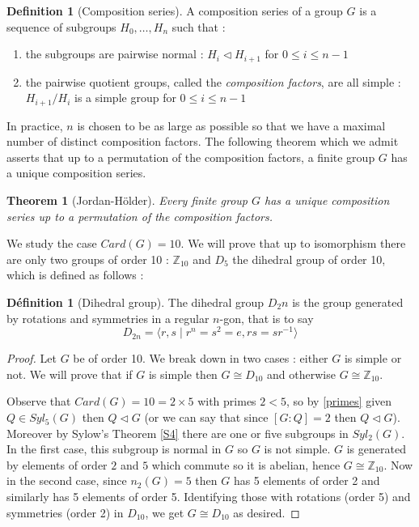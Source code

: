 \documentclass{article}
\theoremstyle{definition}
\newtheorem{definition}[subsubsection]{Définition}
\theoremstyle{plain}
\theoremstyle{plain}
\theoremstyle{plain}
\theoremstyle{plain}
\theoremstyle{definition}
\newtheorem{defeng}[subsubsection]{Definition}
\theoremstyle{plain}
\newtheorem{thmeng}[subsubsection]{Theorem}
\theoremstyle{plain}
\begin{document}
\begin{defeng}[Composition series]
	A composition series of a group \( G \) is a sequence of subgroups \( H_0, \ldots, H_n \) such that :
	\begin{enumerate}[label = (\roman*)]
	\item the subgroups are pairwise normal : 
		\( H_i \triangleleft H_{i+1} \) for \( 0 \leq i \leq n-1 \)
	\item the pairwise quotient groups, called the \textit{composition factors}, are all simple :
		\( H_{i+1}/H_{i} \) is a simple group for \( 0 \leq i \leq n-1 \)

	\end{enumerate}
\par In practice, \( n \) is chosen to be as large as possible so that we have
a maximal number of distinct composition factors. The following theorem which we admit asserts that up to a permutation of the composition factors, a finite group \( G \) has a unique composition series.

\begin{thmeng}[Jordan-Hölder]
	Every finite group \( G \) has a unique composition series up to a permutation of the composition factors.	
\end{thmeng}
\end{defeng}

\par We study the case \( Card(G) = 10 \). We will prove that up to isomorphism there are only two groups of order 10 : \( \mathbb{Z}_{10} \) and \( D_5 \) the dihedral group of order 10, which is defined as follows :

\begin{definition}[Dihedral group]
	The dihedral group \( D_2n \) is the group generated by rotations and symmetries in a regular \(n\)-gon, that is to say 
	\begin{equation*}
		D_{2n} = \langle r,s \mid r^{n} = s^{2} = e, rs = sr^{-1} \rangle 
	\end{equation*}
\end{definition}

\begin{proof}
	Let \( G \) be of order 10. We break down in two cases : either \( G \) is simple or not. We will prove that if \( G \) is simple then \( G \cong D_{10} \) and otherwise \( G \cong \mathbb{Z}_{10} \).

	Observe that \( Card(G) = 10 = 2 \times 5 \) with primes \( 2 < 5\), so by \cref{primes} given \( Q \in Syl_5(G) \) then \( Q \triangleleft G \) (or we can say that since \( [G:Q] = 2 \) then \( Q \triangleleft G \)).
	Moreover by Sylow's Theorem \ref{S4} there are one or five subgroups in \( Syl_2(G) \). In the first case, this subgroup is normal in \( G \) so \( G \) is not simple. \( G \) is generated by elements of order \( 2 \) and \( 5 \) which commute so it is abelian, hence \( G \cong \mathbb{Z}_{10} \). Now in the second case, since \( n_2(G) = 5 \) then \( G \) has 5 elements of order 2 and similarly has 5 elements of order 5. Identifying those with rotations (order 5) and symmetries (order 2) in \( D_{10} \), we get \( G \cong D_{10} \) as desired.
\end{proof} 
\end{document}
